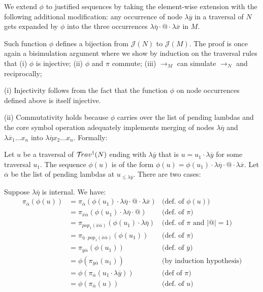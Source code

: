 \documentclass{article}
\theoremstyle{definition}
\def\coresymbol{\pi} %
\def\justseqset{\mathcal{J}}
\begin{document}
\begin{description}
    We extend $\phi$ to justified sequences by taking the element-wise extension with the following additional modification: any occurrence of node $\lambda\overline{y}$ in a traversal of $N$ gets expanded by $\phi$ into the three occurrences $\lambda\overline\eta \cdot @ \cdot \lambda\overline{x}$ in $M$.

    Such function $\phi$ defines a bijection from $\justseqset(N)$ to
    $\justseqset(M)$. The proof is once again a bisimulation argument where we show by induction on the traversal rules that
    (i)  $\phi$ is injective;
    (ii) $\phi$ and $\coresymbol$ commute;
    (iii) $\rightarrow_M$ can simulate $\rightarrow_N$ and reciprocally;

    (i) Injectivity follows from the fact that the function $\phi$ on node occurrences defined above is itself injective.

    (ii) Commutativity holds because $\phi$ carries over the list of pending lambdas and the core symbol operation adequately implements merging of nodes $\lambda\overline\eta$ and
    $\lambda\overline x_1 \ldots x_n$ into
    $\lambda\overline\eta x_2 \ldots x_n$. Formally:

    Let $u$ be a traversal of $\mathcal{T}\!rav^\dagger(N)$
    ending with $\lambda\overline{y}$ that is
    $u = u_1 \cdot \lambda\overline{y} $ for some traversal $u_1$.
    The sequence $\phi(u)$ is of the form
    $\phi(u) = \phi(u_1) \cdot \lambda\overline{\eta} \cdot @ \cdot \lambda\overline{x}$. Let $\overline\alpha$ be the list of pending lambdas at $u_{\leq \lambda\overline{y}}$. There are two cases:

    Suppose $\lambda\overline\eta$ is internal. We have:
    \begin{align*}
        \coresymbol_{\overline\alpha}(\phi(u))
        &=  \coresymbol_{\overline\alpha}(\phi(u_1) \cdot \lambda\overline{\eta} \cdot @ \cdot \lambda\overline{x})
            & \mbox{(def.~of $\phi(u)$)}
        \\
        &=  \coresymbol_{\overline{x}\overline\alpha}(\phi(u_1) \cdot
        \lambda\overline\eta \cdot @)
            & \mbox{(def.~of $\coresymbol$)}
        \\
        &=  \coresymbol_{pop_1(\overline{x}\overline\alpha)}(\phi(u_1) \cdot
        \lambda\overline{\eta})
            & \mbox{(def.~of $\coresymbol$ and $|@|=1$)}
        \\
        &=  \coresymbol_{\overline\eta \cdot pop_1(\overline{x}\overline\alpha)}(\phi(u_1))
            & \mbox{(def.~of $\coresymbol$)}
        \\
        &=  \coresymbol_{\overline{y}\overline\alpha}(\phi(u_1))
            & \mbox{(def.~of $\overline{y}$)}
        \\
        &=  \phi(\coresymbol_{\overline{y}\overline\alpha}(u_1))
            & \mbox{(by induction hypothesis)}
        \\
        &= \phi(\coresymbol_{\overline\alpha}(u_1 \cdot \lambda\overline{y})) & \mbox{(def of $\coresymbol$)} \\
        &=  \phi(\coresymbol_{\overline\alpha}(u))
            & \mbox{(def.~of $u$)}
    \end{align*}


\end{description}
\end{document}
